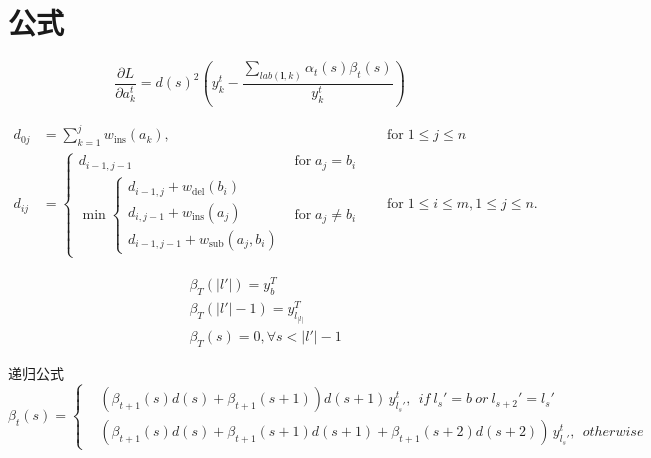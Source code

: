 \documentclass[winfonts]{njuthesis}
\begin{document}
\newpage %


\section{公式}

\begin{equation}
\frac{\partial L}{\partial a_{k}^t} = {d(s)}^2 (y_{k}^t - \frac{\sum_{lab(\mathbf{l},k)} \alpha_t(s)\beta_t(s) }{y_{k}^t} )
\end{equation}

\begin{equation}
\begin{aligned}
d_{{0j}}&=\sum _{{k=1}}^{{j}}w_{{\mathrm  {ins}}}(a_{{k}}),\quad &{\text{for}}\;1\leq j\leq n\\
d_{{ij}}&={\begin{cases}d_{{i-1,j-1}}&{\text{for}}\;a_{{j}}=b_{{i}}\\\min {\begin{cases}d_{{i-1,j}}+w_{{\mathrm  {del}}}(b_{{i}})\\d_{{i,j-1}}+w_{{\mathrm  {ins}}}(a_{{j}})\\d_{{i-1,j-1}}+w_{{\mathrm  {sub}}}(a_{{j}},b_{{i}})\end{cases}}&{\text{for}}\;a_{{j}}\neq b_{{i}}\end{cases}}\quad &{\text{for}}\;1\leq i\leq m,1\leq j\leq n.
\end{aligned}
\end{equation}

\begin{equation}
\begin{aligned}
&\beta_T(|l{}'|)=y_{b}^{T}\\
&\beta_T(|l{}'|-1)=y_{l_|l|}^{T} \\
&\beta_T(s)=0, \forall s < |l{}'|-1
\end{aligned}
\end{equation}

递归公式
\begin{equation}
\beta_t(s)=\left\{
\begin{aligned}
& (\beta_{t+1}(s) d(s)+\beta_{t+1}(s+1))d(s+1)\,  y_{l_s{}'}^t, \: \: if \:  l_s{}'=b \:  or \:  l_{s+2}{}'=l_s{}'\\
& (\beta_{t+1}(s) d(s)+\beta_{t+1}(s+1)d(s+1)+\beta_{t+1}(s+2)d(s+2))\,  y_{l_s{}'}^t,\: \:   otherwise
\end{aligned}
\right.
\end{equation}
\end{document}
